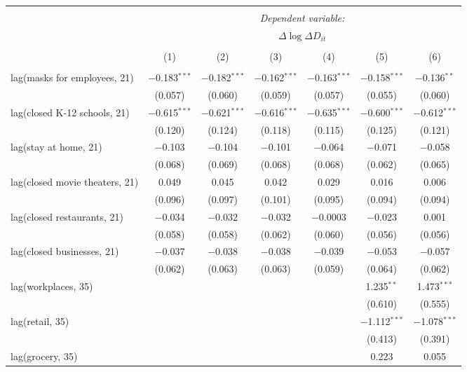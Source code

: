 \begin{tabular}{@{\extracolsep{1pt}}lcccccc} 
\\[-1.8ex]\hline 
\hline \\[-1.8ex] 
 & \multicolumn{6}{c}{\textit{Dependent variable:}} \\ 
\cline{2-7} 
 & \multicolumn{6}{c}{$\Delta \log \Delta D_{it}$} \\ 
\\[-1.8ex] & (1) & (2) & (3) & (4) & (5) & (6)\\ 
\hline \\[-1.8ex] 
 lag(masks for employees, 21) & $-$0.183$^{***}$ & $-$0.182$^{***}$ & $-$0.162$^{***}$ & $-$0.163$^{***}$ & $-$0.158$^{***}$ & $-$0.136$^{**}$ \\ 
  & (0.057) & (0.060) & (0.059) & (0.057) & (0.055) & (0.060) \\ 
  lag(closed K-12 schools, 21) & $-$0.615$^{***}$ & $-$0.621$^{***}$ & $-$0.616$^{***}$ & $-$0.635$^{***}$ & $-$0.600$^{***}$ & $-$0.612$^{***}$ \\ 
  & (0.120) & (0.124) & (0.118) & (0.115) & (0.125) & (0.121) \\ 
  lag(stay at home, 21) & $-$0.103 & $-$0.104 & $-$0.101 & $-$0.064 & $-$0.071 & $-$0.058 \\ 
  & (0.068) & (0.069) & (0.068) & (0.068) & (0.062) & (0.065) \\ 
  lag(closed movie theaters, 21) & 0.049 & 0.045 & 0.042 & 0.029 & 0.016 & 0.006 \\ 
  & (0.096) & (0.097) & (0.101) & (0.095) & (0.094) & (0.094) \\ 
  lag(closed restaurants, 21) & $-$0.034 & $-$0.032 & $-$0.032 & $-$0.0003 & $-$0.023 & 0.001 \\ 
  & (0.058) & (0.058) & (0.062) & (0.060) & (0.056) & (0.056) \\ 
  lag(closed businesses, 21) & $-$0.037 & $-$0.038 & $-$0.038 & $-$0.039 & $-$0.053 & $-$0.057 \\ 
  & (0.062) & (0.063) & (0.063) & (0.059) & (0.064) & (0.062) \\ 
  lag(workplaces, 35) &  &  &  &  & 1.235$^{**}$ & 1.473$^{***}$ \\ 
  &  &  &  &  & (0.610) & (0.555) \\ 
  lag(retail, 35) &  &  &  &  & $-$1.112$^{***}$ & $-$1.078$^{***}$ \\ 
  &  &  &  &  & (0.413) & (0.391) \\ 
  lag(grocery, 35) &  &  &  &  & 0.223 & 0.055 \\ 

\end{tabular}
